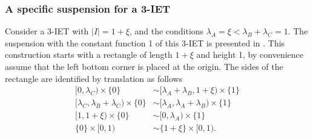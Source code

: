 \documentclass[oneside]{amsart}
\theoremstyle{plain}
\theoremstyle{definition}
\newcommand{\<}{\langle}
\renewcommand{\>}{\rangle}
\renewcommand{\|}{|\!|} %
\begin{document}
\subsubsection{A specific suspension for a 3-IET}
\label{sec:3IET}

Consider a 3-IET with $|I|=1+\xi$, and the conditions $\lambda_A=\xi < \lambda_B + \lambda_C= 1$. The suspension with the constant function 1 of this 3-IET is presented in . This construction starts with a rectangle of length $1+\xi$ and height 1, by convenience assume that the left bottom corner is placed at the origin. The sides of the rectangle are identified by translation as follows
\begin{equation}
\label{eq:Identif3IET}
    \begin{split}
        [0,\lambda_C)\times \{0\} & \sim 
        [\lambda_A+\lambda_B,1+\xi)\times \{1\} \\
        [\lambda_C,\lambda_B+\lambda_C) \times \{0\} 
        & \sim
        [\lambda_A,\lambda_A+\lambda_B) \times \{1\} \\
        [1,1+\xi) \times \{0\} 
        & \sim
        [0,\lambda_A) \times \{1\} \\
        \{0\} \times [0,1) & \sim \{1+\xi\} \times [0,1).
    \end{split}
\end{equation}
\end{document}
